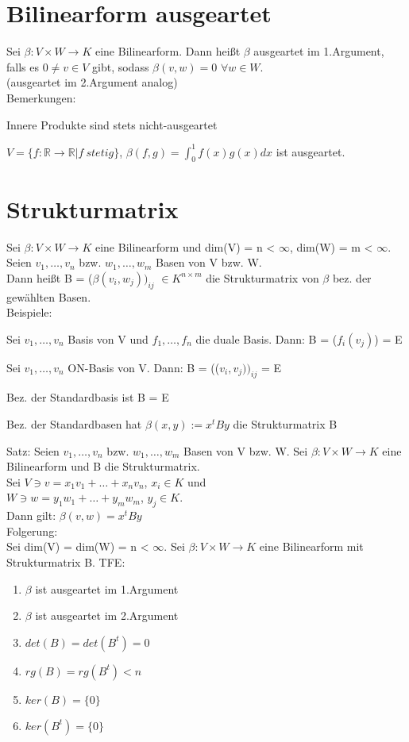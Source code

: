 \section{Bilinearform ausgeartet}
Sei $\beta: V \times W \to K$ eine Bilinearform. Dann heißt $\beta$ ausgeartet im 1.Argument, falls es $0 \neq v \in V$ gibt, sodass $\beta(v,w) = 0$ $\forall w \in W$.\\
(ausgeartet im 2.Argument analog)\\
Bemerkungen:
\begin{compactitem}
\item Innere Produkte sind stets nicht-ausgeartet
\item $V = \{ f: \mathbb{R} \to \mathbb{R} | f~stetig \}$, $\beta(f,g) = \displaystyle\int_0^1 f(x) g(x) dx$ ist ausgeartet.
\end{compactitem}

\section{Strukturmatrix}
Sei $\beta: V \times W \to K$ eine Bilinearform und dim(V) = n < $\infty$, dim(W) = m < $\infty$. Seien $v_1, …, v_n$ bzw. $w_1, …, w_m$ Basen von V bzw. W.\\
Dann heißt B = ($\beta(v_i, w_j))_{ij}$ $\in K^{n \times m}$ die Strukturmatrix von $\beta$ bez. der gewählten Basen.\\
Beispiele:
\begin{compactitem}
\item Sei $v_1, …, v_n$ Basis von V und $f_1, …, f_n$ die duale Basis. Dann: B = ($f_i(v_j)$) = E
\item Sei $v_1, …, v_n$ ON-Basis von V. Dann: B = (($v_i, v_j))_{ij}$ = E
\item Bez. der Standardbasis ist B = E
\item Bez. der Standardbasen hat $\beta(x,y) := x^tBy$ die Strukturmatrix B
\end{compactitem}
Satz: Seien $v_1, …, v_n$ bzw. $w_1, …, w_m$ Basen von V bzw. W. Sei $\beta: V \times W \to K$ eine Bilinearform und B die Strukturmatrix.\\
Sei $V \ni v = x_1v_1 + … + x_nv_n$, $x_i \in K$ und\\
\hspace*{4mm} $W \ni w = y_1w_1 + … + y_mw_m$, $y_j \in K$.\\
Dann gilt: $\beta(v, w) = x^tBy$\\
Folgerung:\\
Sei dim(V) = dim(W) = n < $\infty$. Sei $\beta: V \times W \to K$ eine Bilinearform mit Strukturmatrix B. TFE:
\begin{enumerate}
\item $\beta$ ist ausgeartet im 1.Argument
\item $\beta$ ist ausgeartet im 2.Argument
\item $det(B) = det(B^t) = 0$
\item $rg(B) = rg(B^t) < n$
\item $ker(B) = \{0\}$
\item $ker(B^t) = \{0\}$
\end{enumerate}
